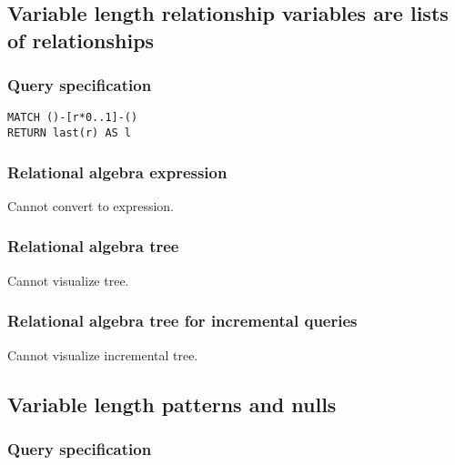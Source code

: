 
\subsection{Variable length relationship variables are lists of relationships}

\subsubsection*{Query specification}

\begin{lstlisting}
MATCH ()-[r*0..1]-()
RETURN last(r) AS l
\end{lstlisting}

\subsubsection*{Relational algebra expression}

Cannot convert to expression.

\subsubsection*{Relational algebra tree}

Cannot visualize tree.

\subsubsection*{Relational algebra tree for incremental queries}

Cannot visualize incremental tree.

\subsection{Variable length patterns and nulls}

\subsubsection*{Query specification}

